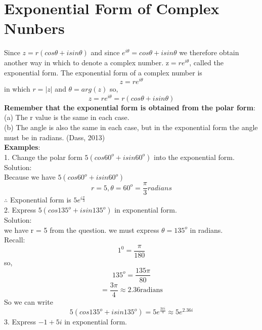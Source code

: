 \documentclass[a4paper, 12pt]{report}
\begin{document}
{\section{Exponential Form of Complex Nunbers}
Since $z = r(cos\theta + isin\theta)$ and since $e^{i\theta} = cos\theta + isin\theta$ we therefore obtain another way in which to denote a complex number. z$ = re^{i\theta}$, called the exponential form. The exponential form of a complex number is 
\begin{equation*}
z = re^{i\theta}
\end{equation*}
in which $r = |z|$ and $\theta = arg(z)$ so, 
\begin{equation*}
z = re^{i\theta} = r(cos\theta + isin\theta)
\end{equation*}
\textbf{Remember that the exponential form is obtained from the polar form}: \\
(a) The r value is the same in each case.\\
(b) The angle is also the same in each case, but in the exponential form the angle must be in radians. (Dass, 2013)\\
\textbf{Examples}:\\
1. Change the polar form $5(cos60^o + isin60^o)$ into the exponential form.\\
Solution:\\
Because we have $5(cos60^o + isin60^o)$
\begin{equation}
r = 5, \theta = 60^o = \frac{\pi}{3}radians
\end{equation}
$\therefore$ Exponential form is $5e^{i\frac{\pi}{3}}$\\
2. Express $5(cos135^o + isin135^o)$ in exponential form.\\
Solution:\\
we have r = 5 from the question. we must express $\theta = 135^o$ in radians.\\
Recall:
\begin{equation*}
1^0 = \frac{\pi}{180}
\end{equation*}
so,
\begin{equation*}
135^o = \frac{135\pi}{80}
\end{equation*}
\begin{equation*}
= \frac{3\pi}{4} \approx \text{2.36radians}
\end{equation*}
So we can write
\begin{equation*}
5(cos135^o + isin135^o) = 5e^{\frac{3\pi i}{4}} \approx 5e^{2.36i}
\end{equation*}
3. Express $-1 + 5i$ in exponential form.\\
}
\end{document}
